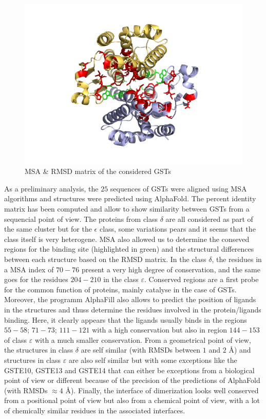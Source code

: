 \begin{figure}[h!]
\begin{minipage}{.32\linewidth}
		\includegraphics[width = .99\textwidth]{figures/GSTD1_DI+BS}
	\end{minipage}
	\caption{MSA \& RMSD matrix of the considered GSTs}
\end{figure}
\noindent As a preliminary analysis, the $25$ sequences of GSTs were aligned using MSA algorithms and structures were predicted using AlphaFold. The percent identity matrix has been computed and allow to show similarity between GSTs from a sequencial point of view. The proteins from class $\delta$ are all considered as part of the same cluster but for the $\epsilon$ class, some variations pears and it seems that the class itself is very heterogene. MSA also  allowed us to determine the conseved regions for the binding site (highlighted in green) and the structural differences between each structure based on the RMSD matrix. In the class $\delta$, the residues in a MSA index of $70-76$ present a very high degree of conservation, and the same goes for the residues $204-210$ in the class $\varepsilon$. Conserved regions are a first probe for the common function of proteins, mainly catalyse in the case of GSTs. Moreover, the programm AlphaFill also allows to predict the position of ligands in the structures and thuss determine the residues involved in the protein/ligands binding. Here, it clearly appears that the ligands usually binds in the regions $55-58$; $71-73$; $111-121$ with a high conservation but also in region $144-153$ of class $\varepsilon$ with a much smaller conservation. From a geometrical point of view, the structures in class $\delta$ are self similar (with RMSDs between $1$ and $2$ \AA) and structures in class $\varepsilon$ are also self similar but with some exceptions like the GSTE10, GSTE13 and GSTE14 that can either be exceptions from a biological point of view or different because of the precision of the predictions of AlphaFold (with RMSDs $\approx 4$ \AA). Finally, the interface of dimerization looks well conserved from a positional point of view but also from a chemical point of view, with a lot of chemically similar residues in the associated interfaces.   
